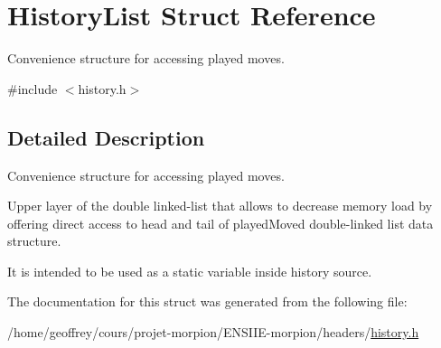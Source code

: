 \hypertarget{struct_history_list}{}\section{History\+List Struct Reference}
\label{struct_history_list}


Convenience structure for accessing played moves.  




{\ttfamily \#include $<$history.\+h$>$}



\subsection{Detailed Description}
Convenience structure for accessing played moves. 

Upper layer of the double linked-\/list that allows to decrease memory load by offering direct access to head and tail of played\+Moved double-\/linked list data structure.

It is intended to be used as a static variable inside history source. 

The documentation for this struct was generated from the following file\+:\begin{DoxyCompactItemize}
\item 
/home/geoffrey/cours/projet-\/morpion/\+E\+N\+S\+I\+I\+E-\/morpion/headers/\hyperlink{history_8h}{history.\+h}\end{DoxyCompactItemize}
